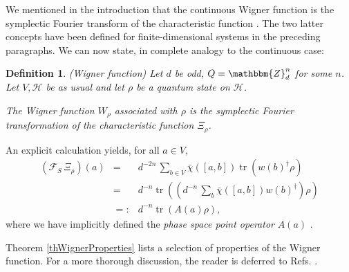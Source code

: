 \documentclass[aps,twocolumn,floatfix]{revtex4}
\newtheorem{definition}[theorem]{Definition}
\def\ZZ{\mathbbm{Z}}
\def\H{\mathcal{H}}
\def\Fou{\mathcal{F}}
\DeclareMathOperator{\tr}{tr}
\begin{document}
We mentioned in the introduction that the continuous Wigner function
is the symplectic Fourier transform of the characteristic function
\cite{wallsmilburn,folland}. The two latter concepts have been defined
for finite-dimensional systems in the preceding paragraphs. We can now
state, in complete analogy to the continuous case:

\begin{definition}\label{dfWigner}
	\emph{(Wigner function)}
	Let $d$ be odd, $Q=\ZZ_d^n$ for some $n$. Let $V, \H$ be as usual
	and let $\rho$ be a quantum state on $\H$.

	The \emph{Wigner function} $W_\rho$ associated with $\rho$ is the
	symplectic Fourier transformation of the characteristic function
	$\Xi_\rho$.
\end{definition}

An explicit calculation yields, for all $a\in V$,
\begin{eqnarray}
	\left(\Fou_S\,\Xi_\rho\right)(a) 
	&=& d^{-2n} \, \sum_{b\in V} \bar\chi([a,b]) \tr(w(b)^\dagger \rho) 
	\nonumber \\
	&=& d^{-n} \tr( \left(d^{-n}\, \sum_{b} \bar\chi([a,b]) w(b)^\dagger\right)
	\rho) \nonumber \\
	&=:& d^{-n} \tr ( A(a) \rho ), \label{pspo}
\end{eqnarray}
where we have implicitly defined the \emph{phase space point
operator} $A(a)$ \cite{wootters}.

Theorem \ref{thWignerProperties} lists a selection of properties of
the Wigner function. For a more thorough discussion, the reader is
deferred to Refs. \cite{diploma,vourdas}.
\end{document}
